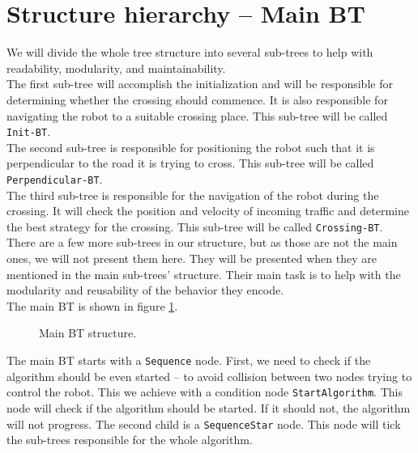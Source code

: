 \section{Structure hierarchy -- Main BT}
    We will divide the whole tree structure into several sub-trees to help with readability, modularity, and maintainability.\\
    The first sub-tree will accomplish the initialization and will be responsible for determining whether the crossing should commence. It is also responsible for navigating the robot to a suitable crossing place. This sub-tree will be called \texttt{Init-BT}.\\
    The second sub-tree is responsible for positioning the robot such that it is perpendicular to the road it is trying to cross. This sub-tree will be called \texttt{Perpendicular-BT}.\\
    The third sub-tree is responsible for the navigation of the robot during the crossing. It will check the position and velocity of incoming traffic and determine the best strategy for the crossing. This sub-tree will be called \texttt{Crossing-BT}.\\
    There are a few more sub-trees in our structure, but as those are not the main ones, we will not present them here. They will be presented when they are mentioned in the main sub-trees' structure. Their main task is to help with the modularity and reusability of the behavior they encode.\\
    The main BT is shown in figure \ref{fig:main-BT}.\\
    \begin{figure}[ht]
        \caption{Main BT structure.}
        \label{fig:main-BT}
    \end{figure}
    The main BT starts with a \texttt{Sequence} node. First, we need to check if the algorithm should be even started -- to avoid collision between two nodes trying to control the robot. This we achieve with a condition node \texttt{StartAlgorithm}. This node will check if the algorithm should be started. If it should not, the algorithm will not progress. The second child is a \texttt{SequenceStar} node. This node will tick the sub-trees responsible for the whole algorithm.\\
